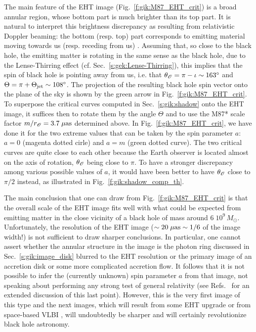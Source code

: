 The main feature of the EHT image (Fig.~\ref{f:gik:M87_EHT_crit}) is a broad annular region, whose bottom part is much brighter
than its top part. It is natural to interpret this brightness discrepancy as resulting from relativistic Doppler beaming: the bottom (resp. top) part corresponds to emitting material
moving towards us (resp. receding from us) \cite{EHT19e}.
Assuming that, so close to the black hole, the emitting
matter is rotating in the same sense as the black hole, due to the
Lense-Thirring effect (cf. Sec.~\ref{s:gek:Lense-Thirring}),
this implies that the
spin of black hole is pointing away from us, i.e. that
$\theta_{\mathscr{O}} = \pi - \iota \sim  163^\circ$ and $\Theta = \pi + \Theta_{\rm jet} \sim 108^\circ$.
The projection of the resulting black hole spin vector onto the plane of the sky is shown by the green
arrow in Fig.~\ref{f:gik:M87_EHT_crit}.
To superpose the critical curves computed in Sec.~\ref{s:gik:shadow} onto the EHT image,
it suffices then to rotate them by the angle $\Theta$ and to use the M87* scale
factor $m/r_{\mathscr{O}} = 3.7 \; \mu{\rm as}$ determined above.
In Fig.~\ref{f:gik:M87_EHT_crit}, we have done it
for the two extreme values that can be taken by the spin parameter $a$: $a=0$ (magenta dotted cirle) and $a=m$ (green dotted curve).
The two critical curves are quite close to each other because the Earth observer is located
almost on the axis of rotation, $\theta_{\mathscr{O}}$ being close to $\pi$. To have a stronger
discrepancy among various possible values of $a$, it would have been
better to have $\theta_{\mathscr{O}}$ close to $\pi/2$ instead, as illustrated in  Fig.~\ref{f:gik:shadow_comp_th}.

The main conclusion that one can draw from Fig.~\ref{f:gik:M87_EHT_crit}
is that the overall scale of the EHT image fits well with what could be
expected from emitting matter in the close vicinity of a black hole
of mass around $6\; 10^9\, M_\odot$. Unfortunately, the resolution
of the EHT image ($\sim 20 \; \mu{\rm as} \sim 1/6$ of the image width!)
is not sufficient to draw sharper conclusions.
In particular,
one cannot assert whether the annular structure in the image
is the photon ring discussed in Sec.~\ref{s:gik:image_disk} blurred to the
EHT resolution or the primary image of an accretion disk
or some more complicated accretion flow.
It follows that it is not possible to infer the (currently unknown) spin parameter $a$ from that image,
not speaking about performing any strong test of general relativity
(see Refs.~\cite{Grall21,GlampP21} for an extended discussion of this last point).
However, this is the very first image of this type and the next images,
which will result from some EHT upgrade or from space-based VLBI \cite{Johns_al24,Lupsa_al24},
will undoubtedly be sharper and will certainly revolutionize black hole astronomy.


